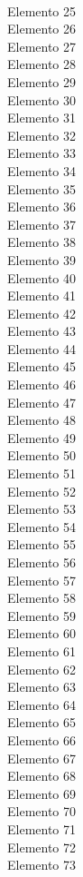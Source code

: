 \documentclass[preview]{standalone}
\begin{document}
\\Elemento 25\\Elemento 26\\Elemento 27\\Elemento 28\\Elemento 29\\Elemento 30\\Elemento 31\\Elemento 32\\Elemento 33\\Elemento 34\\Elemento 35\\Elemento 36\\Elemento 37\\Elemento 38\\Elemento 39\\Elemento 40\\Elemento 41\\Elemento 42\\Elemento 43\\Elemento 44\\Elemento 45\\Elemento 46\\Elemento 47\\Elemento 48\\Elemento 49\\Elemento 50\\Elemento 51\\Elemento 52\\Elemento 53\\Elemento 54\\Elemento 55\\Elemento 56\\Elemento 57\\Elemento 58\\Elemento 59\\Elemento 60\\Elemento 61\\Elemento 62\\Elemento 63\\Elemento 64\\Elemento 65\\Elemento 66\\Elemento 67\\Elemento 68\\Elemento 69\\Elemento 70\\Elemento 71\\Elemento 72\\Elemento 73
\end{document}
